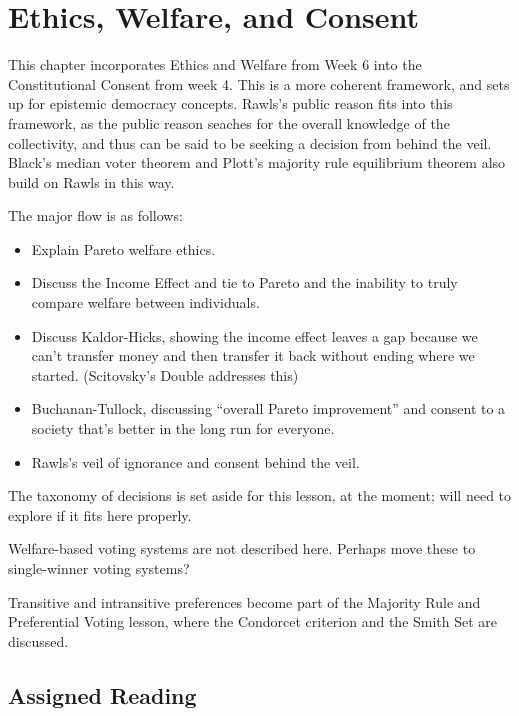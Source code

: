 \chapter{Ethics, Welfare, and Consent}

This chapter incorporates Ethics and Welfare from Week 6 into the Constitutional Consent from week 4.  This is a more coherent framework, and sets up for epistemic democracy concepts.  Rawls's public reason fits into this framework, as the public reason seaches for the overall knowledge of the collectivity, and thus can be said to be seeking a decision from behind the veil.  Black's median voter theorem and Plott's majority rule equilibrium theorem also build on Rawls in this way.

The major flow is as follows:

\begin{itemize}
    \item Explain Pareto welfare ethics.

    \item Discuss the Income Effect and tie to Pareto and the inability to truly compare welfare between individuals.

    \item Discuss Kaldor-Hicks, showing the income effect leaves a gap because we can't transfer money and then transfer it back without ending where we started.  (Scitovsky's Double addresses this)

    \item Buchanan-Tullock, discussing ``overall Pareto improvement'' and consent to a society that's better in the long run for everyone.

    \item Rawls's veil of ignorance and consent behind the veil.
\end{itemize}

The taxonomy of decisions is set aside for this lesson, at the moment; will need to explore if it fits here properly.

Welfare-based voting systems are not described here.  Perhaps move these to single-winner voting systems?

Transitive and intransitive preferences become part of the Majority Rule and Preferential Voting lesson, where the Condorcet criterion and the Smith Set are discussed.

\section{Assigned Reading}

